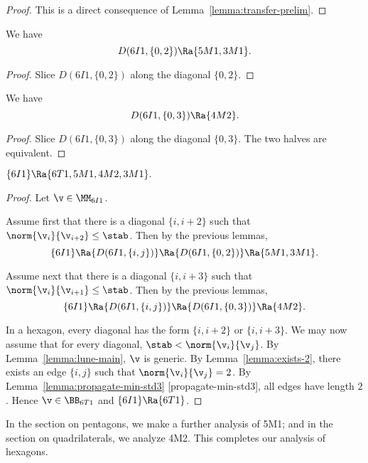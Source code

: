\begin{proof} This is a direct consequence of Lemma~\ref{lemma:transfer-prelim}.
\end{proof}



\begin{lemma}\label{lemma:hex-slice}
We have
\[
D(6I1,\{0,2\}) \Ra \{5M1,3M1\}.
\]
\end{lemma}

\begin{proof}
Slice $D(6I1,\{0,2\})$ along the diagonal $\{0,2\}$.
\end{proof}

\begin{lemma}\label{lemma:hex-slice2}
We have
\[
D(6I1,\{0,3\}) \Ra \{4M2\}.
\]
\end{lemma}

\begin{proof}
Slice $D(6I1,\{0,3\})$ along the diagonal $\{0,3\}$. The two halves are equivalent.
\end{proof}

\begin{lemma}\label{lemma:hex-slice3}
$\{6I1\}\Ra \{6T1,5M1,4M2,3M1\}.$
\end{lemma}

\begin{proof}
Let $\v\in \MM_{6I1}$.  

Assume first that there is a diagonal $\{i,i+2\}$ such that $\norm{\v_i}{\v_{i+2}}\le \stab$.
Then by the previous lemmas,
\[
\{6I1\}\Ra \{D(6I1,\{i,j\})\} \Ra \{D(6I1,\{0,2\})\} \Ra \{5M1,3M1\}.
\]

Assume next
that there is a diagonal $\{i,i+3\}$ such that $\norm{\v_i}{\v_{i+1}}\le \stab$.
Then by the previous lemmas,
\[
\{6I1\}\Ra \{D(6I1,\{i,j\})\} \Ra \{D(6I1,\{0,3\})\} \Ra \{4M2\}.
\]

In a hexagon, every diagonal has the form $\{i,i+2\}$ or $\{i,i+3\}$.  We may now assume that
for every diagonal, $\stab < \norm{\v_i}{\v_j}$.  By Lemma~\ref{lemma:lune-main}, $\v$ is generic.
By Lemma~\ref{lemma:exists-2}, there exists an edge $\{i,j\}$ such that $\norm{\v_i}{\v_j} = 2$.
By Lemma~\ref{lemma:propagate-min-std3} [propagate-min-std3], all edges have length $2$.
Hence $\v\in \BB_{6T1}$ and $\{6I1\}\Ra \{6T1\}$.
\end{proof}

In the section on pentagons, we make a further analysis of 5M1; and in the section on quadrilaterals, we analyze 4M2.
This completes our analysis of hexagons.  

